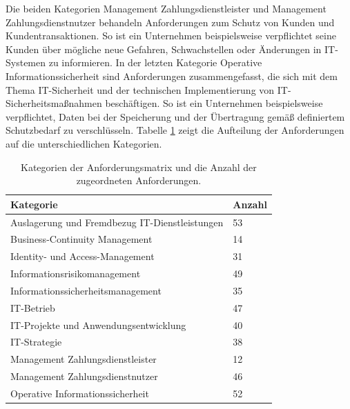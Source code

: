 \bigbreak
Die beiden Kategorien \glqq{}Management Zahlungsdienstleister\grqq{} und \glqq{}Management Zahlungsdienstnutzer\grqq{} behandeln Anforderungen zum Schutz von Kunden und Kundentransaktionen. So ist ein Unternehmen beispielsweise verpflichtet seine Kunden über mögliche neue Gefahren, Schwachstellen oder Änderungen in IT-Systemen zu informieren. In der letzten Kategorie \glqq{}Operative Informationssicherheit\grqq{} sind Anforderungen zusammengefasst, die sich mit dem Thema IT-Sicherheit und der technischen Implementierung von IT-Sicherheitsmaßnahmen beschäftigen. So ist ein Unternehmen beispielsweise verpflichtet, Daten bei der Speicherung und der Übertragung gemäß definiertem Schutzbedarf zu verschlüsseln. 
\bigbreak
Tabelle \ref{table:kategorien_gesamt} zeigt die Aufteilung der Anforderungen auf die unterschiedlichen Kategorien. 

\begin{table}[H]
    \centering
    \caption{Kategorien der Anforderungsmatrix und die Anzahl der zugeordneten Anforderungen.} 
    \begin{tabular}{ll}
        \hline
        Kategorie & Anzahl\\
        \hline\hline
        Auslagerung und Fremdbezug IT-Dienstleistungen & 53\\
        Business-Continuity Management & 14\\
        Identity- und Access-Management & 31\\
        Informationsrisikomanagement & 49\\
        Informationssicherheitsmanagement & 35\\
        IT-Betrieb & 47\\
        IT-Projekte und Anwendungsentwicklung & 40\\
        IT-Strategie & 38\\
        Management Zahlungsdienstleister & 12\\
        Management Zahlungsdienstnutzer & 46\\
        Operative Informationssicherheit & 52\\
    \end{tabular}
    \label{table:kategorien_gesamt}
\end{table}


